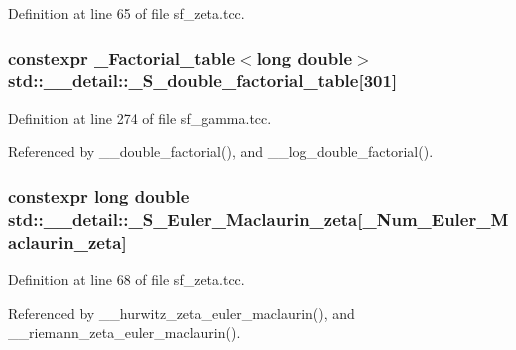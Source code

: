 Definition at line 65 of file sf\+\_\+zeta.\+tcc.

\hypertarget{namespacestd_1_1____detail_a6d1131fefdb30b2746c76ff801bdc833}{}
\subsubsection[{\+\_\+\+S\+\_\+double\+\_\+factorial\+\_\+table}]{\setlength{\rightskip}{0pt plus 5cm}constexpr {\bf \+\_\+\+Factorial\+\_\+table}$<$long double$>$ std\+::\+\_\+\+\_\+detail\+::\+\_\+\+S\+\_\+double\+\_\+factorial\+\_\+table\mbox{[}301\mbox{]}}\label{namespacestd_1_1____detail_a6d1131fefdb30b2746c76ff801bdc833}


Definition at line 274 of file sf\+\_\+gamma.\+tcc.



Referenced by \+\_\+\+\_\+double\+\_\+factorial(), and \+\_\+\+\_\+log\+\_\+double\+\_\+factorial().

\hypertarget{namespacestd_1_1____detail_acd941b49595dd03e93c88107ad2f68c2}{}
\subsubsection[{\+\_\+\+S\+\_\+\+Euler\+\_\+\+Maclaurin\+\_\+zeta}]{\setlength{\rightskip}{0pt plus 5cm}constexpr long double std\+::\+\_\+\+\_\+detail\+::\+\_\+\+S\+\_\+\+Euler\+\_\+\+Maclaurin\+\_\+zeta\mbox{[}{\bf \+\_\+\+Num\+\_\+\+Euler\+\_\+\+Maclaurin\+\_\+zeta}\mbox{]}}\label{namespacestd_1_1____detail_acd941b49595dd03e93c88107ad2f68c2}


Definition at line 68 of file sf\+\_\+zeta.\+tcc.



Referenced by \+\_\+\+\_\+hurwitz\+\_\+zeta\+\_\+euler\+\_\+maclaurin(), and \+\_\+\+\_\+riemann\+\_\+zeta\+\_\+euler\+\_\+maclaurin().

\hypertarget{namespacestd_1_1____detail_a008b54abe31c1027aefdfd7a76a40e99}{}
